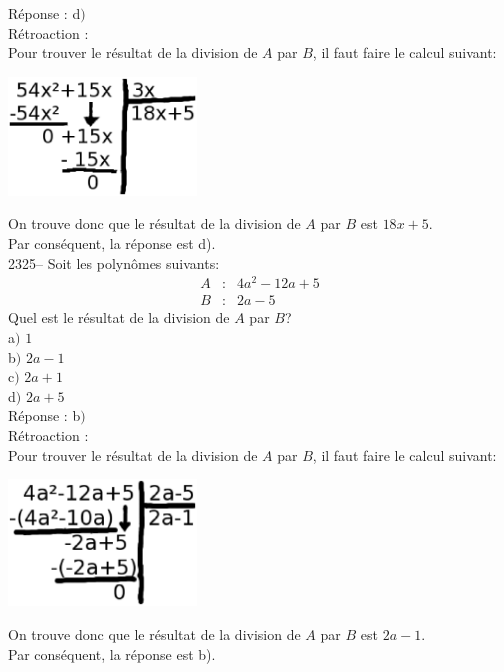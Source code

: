\documentclass[letterpaper, 12pt]{article}
\begin{document}
R\'eponse : d$)$\\

R\'etroaction :\\
Pour trouver le r\'esultat de la division de $A$ par $B$, il faut faire le calcul suivant:
\begin{center}
 \includegraphics[width=5cm,bb=14 14 435 315]{Q2324.eps}
\end{center}
On trouve donc que le r\'esultat de la division de $A$ par $B$ est $18x+5$.\\
Par cons\'equent, la r\'eponse est d).\\

2325--  Soit les polyn\^omes suivants:
\begin{eqnarray*}
 A&:&4a^{2}-12a+5\\
B&:&2a-5
\end{eqnarray*}
Quel est le r\'esultat de la division de $A$ par $B$?\\

a$)$ $1$\\
b$)$ $2a-1$\\
c$)$ $2a+1$\\
d$)$ $2a+5$\\

R\'eponse : b$)$\\

R\'etroaction :\\
Pour trouver le r\'esultat de la division de $A$ par $B$, il faut faire le calcul suivant:
\begin{center}
 \includegraphics[width=5cm,bb=14 14 435 315]{Q2325.eps}
\end{center}
On trouve donc que le r\'esultat de la division de $A$ par $B$ est $2a-1$.\\
Par cons\'equent, la r\'eponse est b).\\
\end{document}
